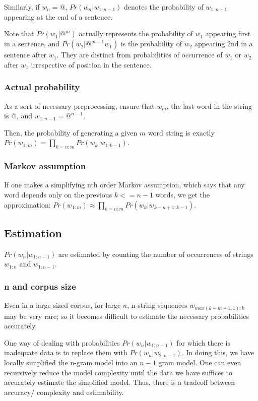 \documentclass[oneside, article]{memoir}
\begin{document}
Similarly, if $w_{n} = @$, $Pr(w_n|w_{1:n-1})$ denotes the probability of $w_{1:n-1}$ appearing at the end of a sentence.

Note that $Pr(w_1|@^m)$ actually represents the probability of $w_1$ appearing first in a sentence, and $Pr(w_2|@^{m-1}w_1)$ is the probability of $w_2$ appearing 2nd in a sentence after $w_1$. They are distinct from probabilities of occurrence of $w_1$ or $w_2$ after $w_1$ irrespective of position in the sentence.

\subsubsection{Actual probability}
As a sort of necessary preprocessing, ensure that $w_m$, the last word in the string is $@$, and $w_{1:n-1} = @^{n-1}$.

Then, the probability of generating a given $m$ word string is exactly \\$Pr(w_{1:m}) = \prod_{k=n:m} Pr(w_k|w_{1:k-1})$.

\subsubsection{Markov assumption}
If one makes a simplifying nth order Markov assumption, which says that any word depends only on the previous $k<=n-1$ words, we get the approximation: $Pr(w_{1:m}) \approx \prod_{k=n:m} Pr(w_k|w_{k-n+1:k-1})$.

\subsection{Estimation}
$Pr(w_n|w_{1:n-1})$ are estimated by counting the number of occurrences of strings $w_{1:n}$ and $w_{1:n-1}$.

\subsubsection{n and corpus size}
Even in a large sized corpus, for large $n$, n-string sequences $w_{max(k-m+1, 1): k}$ may be very rare; so it becomes difficult to estimate the necessary probabilities accurately.

One way of dealing with probabilities $Pr(w_n|w_{1:n-1})$ for which there is inadequate data is to replace them with $Pr(w_n|w_{2:n-1})$. In doing this, we have locally simplified the n-gram model into an $n-1$ gram model. One can even recursively reduce the model complexity until the data we have suffices to accurately estimate the simplified model. Thus, there is a tradeoff between accuracy/ complexity and estimability.
\end{document}
